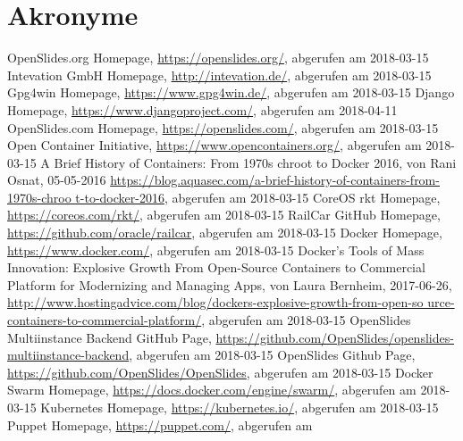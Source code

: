 \documentclass[a4paper]{article}
\begin{document}
\section*{Akronyme}
\begin{acronym}[Bash]
\end{acronym}
\begin{thebibliography}{999}
	 OpenSlides.org Homepage, \url{https://openslides.org/}, 
	abgerufen am 2018-03-15
	 Intevation GmbH Homepage, \url{http://intevation.de/}, 
	abgerufen am 2018-03-15
	 Gpg4win Homepage, \url{https://www.gpg4win.de/}, 
	abgerufen am 2018-03-15
	 Django Homepage, \url{https://www.djangoproject.com/},
	abgerufen am 2018-04-11
	 OpenSlides.com Homepage, \url{https://openslides.com/}, 
	abgerufen am 2018-03-15
	 Open Container Initiative, 
	\url{https://www.opencontainers.org/}, abgerufen am 2018-03-15
	 \glqq{}A Brief History of Containers: From 1970s 
	chroot to Docker 2016\grqq{}, von Rani Osnat, 05-05-2016 
	\url{https://blog.aquasec.com/a-brief-history-of-containers-from-1970s-chroo
	t-to-docker-2016},
	 abgerufen am 2018-03-15
	 CoreOS rkt Homepage, \url{https://coreos.com/rkt/}, 
	abgerufen am 2018-03-15
	 RailCar GitHub Homepage, 
	\url{https://github.com/oracle/railcar}, abgerufen am 2018-03-15
	 Docker Homepage, \url{https://www.docker.com/}, 
	abgerufen am 2018-03-15
	 \glqq{}Docker's Tools of Mass Innovation: Explosive 
	Growth From Open-Source Containers to Commercial Platform for Modernizing 
	and Managing Apps\grqq{}, von Laura Bernheim, 2017-06-26, 
	\url{http://www.hostingadvice.com/blog/dockers-explosive-growth-from-open-so
	urce-containers-to-commercial-platform/},
	 abgerufen am 2018-03-15
	 OpenSlides Multiinstance Backend GitHub Page, 
	\url{https://github.com/OpenSlides/openslides-multiinstance-backend}, 
	abgerufen am 2018-03-15
	 OpenSlides Github Page, 
	\url{https://github.com/OpenSlides/OpenSlides}, abgerufen am 2018-03-15
	 Docker Swarm Homepage, 
	\url{https://docs.docker.com/engine/swarm/}, abgerufen am 2018-03-15
	 Kubernetes Homepage, \url{https://kubernetes.io/}, 
	abgerufen am 2018-03-15
	 Puppet Homepage, \url{https://puppet.com/}, abgerufen am 

\end{thebibliography}
\end{document}
